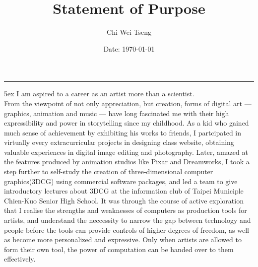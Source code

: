 \documentclass[a4paper, 12pt]{article}
\title{Statement of Purpose}
\author{Chi-Wei Tseng}
\date{Date: \today}
\makeatletter
\newcommand{\HRule}{\rule{\linewidth}{0.2mm}}
\renewcommand{\maketitle}{
  \parindent=0pt%
  \begin{flushleft}
  \bf \large{\@author}
  \HRule
  \end{flushleft}
  \begin{center}
    \MakeUppercase{\bf \@title}
  \end{center}%
    \par
}
\makeatother
\begin{document}
{\linespread{0.8} \maketitle}
\parindent 5ex
I am aspired to a career as an artist more than a scientist.\\

From the viewpoint of not only appreciation, but creation, forms of digital art --- graphics, animation and music --- have long fascinated me with their high expressibility and power in storytelling since my childhood. As a kid who gained much sense of achievement by exhibiting his works to friends, I partcipated in virtually every extracurricular projects in designing class website, obtaining valuable experiences in digital image editing and photography. Later, amazed at the features produced by animation studios like Pixar and Dreamworks, I took a step further to self-study the creation of three-dimensional computer graphics(3DCG) using commercial software packages, and led a team to give introductory lectures about 3DCG at the information club of Taipei Municiple Chien-Kuo Senior High School. It was through the course of active exploration that I realise the strengths and weaknesses of computers as production tools for artists, and understand the neccessity to narrow the gap between technology and people before the tools can provide controls of higher degrees of freedom, as well as become more personalized and expressive. Only when artists are allowed to form their own tool, the power of computation can be handed over to them effectively.


\end{document}
